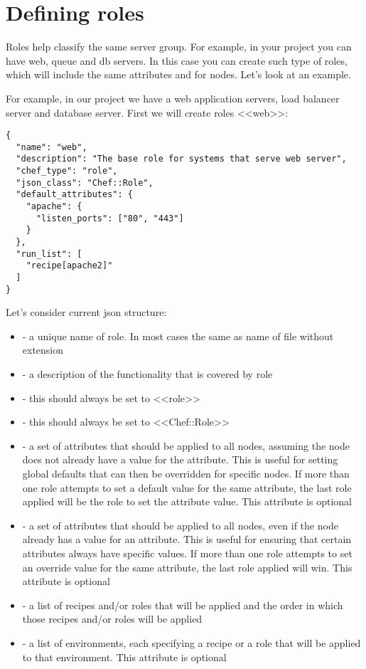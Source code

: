 \section{Defining roles}
\label{sec:solo-role}

Roles help classify the same server group. For example, in your project you can have web, queue and db servers. In this case you can create such type of roles, which will include the same attributes and  for nodes. Let's look at an example.

For example, in our project we have a web application servers, load balancer server and database server. First we will create roles <<web>>:

\begin{lstlisting}[label=lst:my-cloud-role1,title=my-cloud/roles/web.json]
{
  "name": "web",
  "description": "The base role for systems that serve web server",
  "chef_type": "role",
  "json_class": "Chef::Role",
  "default_attributes": {
    "apache": {
      "listen_ports": ["80", "443"]
    }
  },
  "run_list": [
    "recipe[apache2]"
  ]
}
\end{lstlisting}

Let's consider current json structure:

\begin{itemize}
  \item {} - a unique name of role. In most cases the same as name of file without extension
  \item {} - a description of the functionality that is covered by role
  \item {} - this should always be set to <<role>>
  \item {} - this should always be set to <<Chef::Role>>
  \item {} - a set of attributes that should be applied to all nodes, assuming the node does not already have a value for the attribute. This is useful for setting global defaults that can then be overridden for specific nodes. If more than one role attempts to set a default value for the same attribute, the last role applied will be the role to set the attribute value. This attribute is optional
  \item {} - a set of attributes that should be applied to all nodes, even if the node already has a value for an attribute. This is useful for ensuring that certain attributes always have specific values. If more than one role attempts to set an override value for the same attribute, the last role applied will win. This attribute is optional
  \item {} - a list of recipes and/or roles that will be applied and the order in which those recipes and/or roles will be applied
  \item {} - a list of environments, each specifying a recipe or a role that will be applied to that environment. This attribute is optional
\end{itemize}

